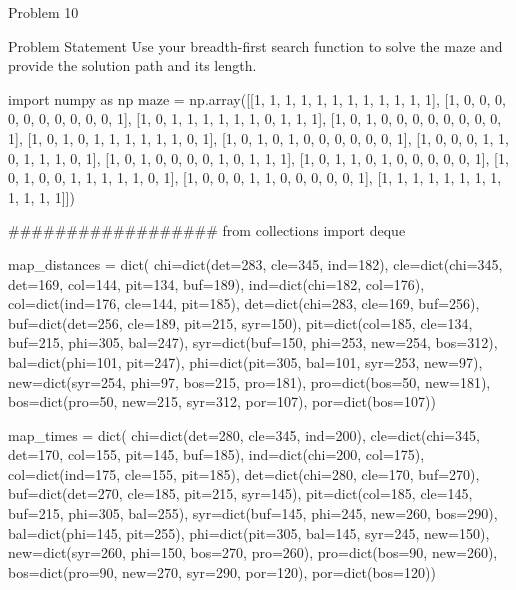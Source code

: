 \begin{problem}{Problem 10}
    \begin{statement}{Problem Statement}
        Use your breadth-first search function to solve the maze and provide the solution path and its length.
    \end{statement}

    \begin{highlight}[Solution]
    \begin{code}[Python]
    import numpy as np
    maze = np.array([[1, 1, 1, 1, 1, 1, 1, 1, 1, 1, 1, 1],
                    [1, 0, 0, 0, 0, 0, 0, 0, 0, 0, 0, 1],
                    [1, 0, 1, 1, 1, 1, 1, 1, 0, 1, 1, 1],
                    [1, 0, 1, 0, 0, 0, 0, 0, 0, 0, 0, 1],
                    [1, 0, 1, 0, 1, 1, 1, 1, 1, 1, 0, 1],
                    [1, 0, 1, 0, 1, 0, 0, 0, 0, 0, 0, 1],
                    [1, 0, 0, 0, 1, 1, 0, 1, 1, 1, 0, 1],
                    [1, 0, 1, 0, 0, 0, 0, 1, 0, 1, 1, 1],
                    [1, 0, 1, 1, 0, 1, 0, 0, 0, 0, 0, 1],
                    [1, 0, 1, 0, 0, 1, 1, 1, 1, 1, 0, 1],
                    [1, 0, 0, 0, 1, 1, 0, 0, 0, 0, 0, 1],
                    [1, 1, 1, 1, 1, 1, 1, 1, 1, 1, 1, 1]])
    
    ##################
    from collections import deque
    
    map_distances = dict(
        chi=dict(det=283, cle=345, ind=182),
        cle=dict(chi=345, det=169, col=144, pit=134, buf=189),
        ind=dict(chi=182, col=176),
        col=dict(ind=176, cle=144, pit=185),
        det=dict(chi=283, cle=169, buf=256),
        buf=dict(det=256, cle=189, pit=215, syr=150),
        pit=dict(col=185, cle=134, buf=215, phi=305, bal=247),
        syr=dict(buf=150, phi=253, new=254, bos=312),
        bal=dict(phi=101, pit=247),
        phi=dict(pit=305, bal=101, syr=253, new=97),
        new=dict(syr=254, phi=97, bos=215, pro=181),
        pro=dict(bos=50, new=181),
        bos=dict(pro=50, new=215, syr=312, por=107),
        por=dict(bos=107))
    
    
    map_times = dict(
        chi=dict(det=280, cle=345, ind=200),
        cle=dict(chi=345, det=170, col=155, pit=145, buf=185),
        ind=dict(chi=200, col=175),
        col=dict(ind=175, cle=155, pit=185),
        det=dict(chi=280, cle=170, buf=270),
        buf=dict(det=270, cle=185, pit=215, syr=145),
        pit=dict(col=185, cle=145, buf=215, phi=305, bal=255),
        syr=dict(buf=145, phi=245, new=260, bos=290),
        bal=dict(phi=145, pit=255),
        phi=dict(pit=305, bal=145, syr=245, new=150),
        new=dict(syr=260, phi=150, bos=270, pro=260),
        pro=dict(bos=90, new=260),
        bos=dict(pro=90, new=270, syr=290, por=120),
        por=dict(bos=120))
    

\end{code}
\end{highlight}
\end{problem}
